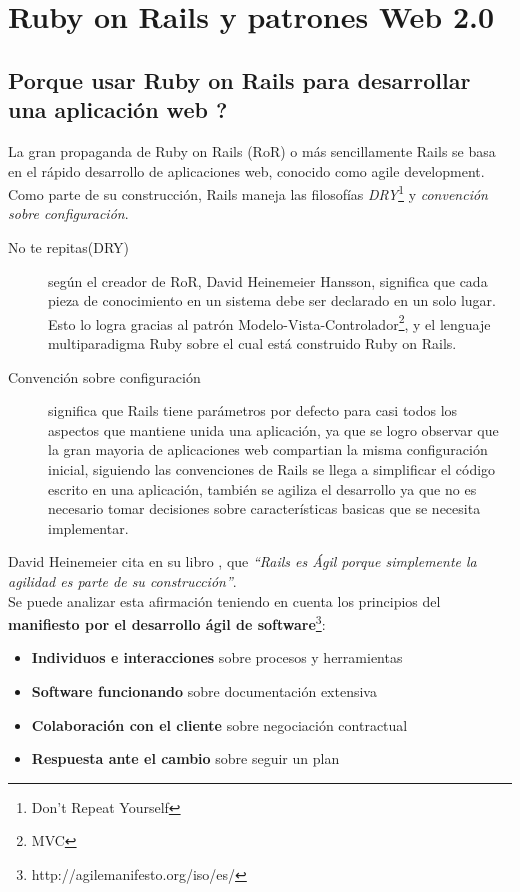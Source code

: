 \chapter{Ruby on Rails y patrones Web 2.0} %
\label{cha:ruby_on_rails_y_patrones_web_2_0}

  \section{Porque usar Ruby on Rails para desarrollar una aplicación web ?} %
  \label{sec:porque_usar_ruby_on_rails_para_desarrollar_una_aplicacion_web}

    La gran propaganda de Ruby on Rails (RoR) o más sencillamente Rails
    se basa en el rápido desarrollo de aplicaciones web, conocido como agile development.
    Como parte de su construcci\'on, Rails maneja las filosofías \emph{DRY}\footnote{Don’t Repeat Yourself} y \emph{convención sobre configuración}. 

    \begin{description}
      \item[No te repitas(DRY)] según el creador de RoR, \mbox{David} \mbox{Heinemeier} Hansson, 
      significa que cada pieza de conocimiento en un sistema 
      debe ser declarado en un solo lugar.\cite{awdr4e} 
      Esto lo logra gracias al patrón Modelo-Vista-Controlador\footnote{MVC}, 
      y el lenguaje multiparadigma Ruby sobre el cual está construido Ruby on Rails.
      
      \item[Convención sobre configuración] significa que Rails tiene parámetros por 
      defecto para casi todos los aspectos que mantiene unida una aplicación, ya que se logro
      observar que la gran mayoria de aplicaciones web compartian la misma configuraci\'on inicial,
      siguiendo  las convenciones de Rails se llega a simplificar el código escrito en una aplicación, tambi\'en se agiliza el desarrollo ya que no es necesario tomar decisiones sobre características basicas que se necesita implementar.
    \end{description}


    David Heinemeier cita en su libro \cite{awdr4e}, que \emph{“Rails es Ágil porque 
    simplemente la agilidad es parte de su construcción”}.\\

    Se puede analizar esta afirmaci\'on teniendo en cuenta los principios del
     \textbf{manifiesto por el desarrollo ágil de software}\footnote{http://agilemanifesto.org/iso/es/}:
    \begin{itemize}
      \item \textbf{Individuos e interacciones} sobre procesos y herramientas
      \item \textbf{Software funcionando} sobre documentación extensiva
      \item \textbf{Colaboración con el cliente} sobre negociación contractual
      \item \textbf{Respuesta ante el cambio} sobre seguir un plan
    \end{itemize}
    
